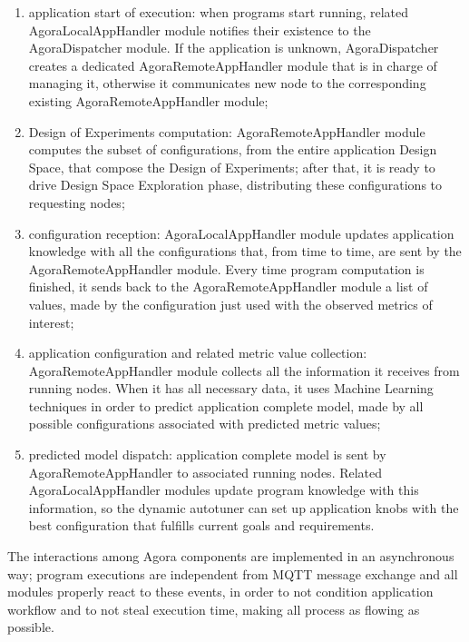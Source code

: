 \begin{enumerate}

    \item application start of execution: when programs start running, related AgoraLocalAppHandler module notifies their existence to the AgoraDispatcher module. If the application is unknown, AgoraDispatcher creates a dedicated AgoraRemoteAppHandler module that is in charge of managing it, otherwise it communicates new node to the corresponding existing AgoraRemoteAppHandler module;
    
    \item Design of Experiments computation: AgoraRemoteAppHandler module computes the subset of configurations, from the entire application Design Space, that compose the Design of Experiments; after that, it is ready to drive Design Space Exploration phase, distributing these configurations to requesting nodes;
    
    \item configuration reception: AgoraLocalAppHandler module updates application knowledge with all the configurations that, from time to time, are sent by the AgoraRemoteAppHandler module. Every time program computation is finished, it sends back to the AgoraRemoteAppHandler module a list of values, made by the configuration just used with the observed metrics of interest;
    
    \item application configuration and related metric value collection: A\-go\-ra\-Remote\-App\-Handler module collects all the information it receives from running nodes. When it has all necessary data, it uses Machine Learning techniques in order to predict application complete model, made by all possible configurations associated with predicted metric values;
    
    \item predicted model dispatch: application complete model is sent by AgoraRemoteAppHandler to associated running nodes. Related AgoraLocalAppHandler modules update program knowledge with this information, so the dynamic autotuner can set up application knobs with the best configuration that fulfills current goals and requirements.

\end{enumerate}

The interactions among Agora components are implemented in an asynchronous way; program executions are independent from MQTT message exchange and all modules properly react to these events, in order to not condition application workflow and to not steal execution time, making all process as flowing as possible.
